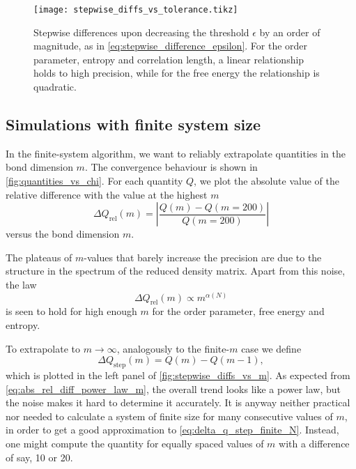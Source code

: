 \begin{figure}
  \texttt{[image: stepwise\_diffs\_vs\_tolerance.tikz]}
  \caption{Stepwise differences upon decreasing the threshold $\epsilon$ by an order of magnitude,
  as in \autoref{eq:stepwise_difference_epsilon}.
  For the order parameter, entropy and correlation length, a linear relationship holds to high precision,
  while for the free energy the relationship is quadratic.}\label{fig:stepwise_diffs_vs_tolerance}
\end{figure}

\subsection{Simulations with finite system size}\label{sec:simulations_with_finite_system_size}
In the finite-system algorithm, we want to reliably extrapolate quantities in the bond dimension $m$.
The convergence behaviour is shown in \autoref{fig:quantities_vs_chi}.
For each quantity $Q$, we plot the absolute value of the relative difference with the value at the highest $m$
\begin{equation}\label{eq:abs_rel_diff_quantity_m}
  \Delta Q_{\text{rel}}(m) = \left| \frac{Q(m) - Q(m = 200)}{Q(m = 200)} \right|
\end{equation}
versus the bond dimension $m$.

The plateaus of $m$-values that barely increase the precision are due to the structure in the spectrum of the reduced
density matrix. Apart from this noise, the law
\begin{equation}\label{eq:abs_rel_diff_power_law_m}
  \Delta Q_{\text{rel}}(m) \propto m^{\alpha(N)}
\end{equation}
is seen to hold for high enough $m$ for the order parameter, free energy and entropy.

To extrapolate to $m \to \infty$, analogously to the finite-$m$ case we define
\begin{equation}\label{eq:delta_q_step_finite_N}
  \Delta Q_{\text{step}}(m) = Q(m) - Q(m - 1),
\end{equation}
which is plotted in the left panel of \autoref{fig:stepwise_diffs_vs_m}.
As expected from \autoref{eq:abs_rel_diff_power_law_m}, the overall trend looks like a power law,
but the noise makes it hard to determine it accurately.
It is anyway neither practical nor needed to calculate a system of finite size for many consecutive values of $m$,
in order to get a good approximation to \autoref{eq:delta_q_step_finite_N}.
Instead, one might compute the quantity for equally spaced values of $m$ with a difference of say,
10 or 20.

